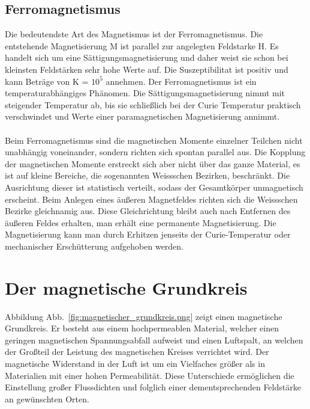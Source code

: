 \documentclass[a4paper,twoside,12pt,DIV=13,BCOR=5mm,numbers=noenddot,cleardoublepage=empty]{scrbook}
\begin{document}
        \subsection{Ferromagnetismus}
        Die bedeutendste Art des Magnetismus ist der Ferromagnetismus. Die 
        entstehende Magnetisierung M ist parallel zur angelegten Feldstarke H. 
        Es handelt sich um eine S\"attigungsmagnetisierung und daher weist sie 
        schon bei kleinsten Feldst\"arken sehr hohe Werte auf. Die 
        Suszeptibilitat ist positiv und kann Betr\"age von K = $10^5$ annehmen. 
        Der Ferromagnetismus ist ein temperaturabh\"angiges Ph\"anomen. Die 
        S\"attigungsmagnetisierung nimmt mit steigender Temperatur ab, bis sie 
        schlie\ss{}lich bei der Curie Temperatur praktisch verschwindet und Werte 
        einer paramagnetischen Magnetisierung annimmt.
        \\
        \\
        Beim Ferromagnetismus sind die magnetischen Momente einzelner Teilchen 
        nicht unabh\"angig voneinander, sondern richten sich spontan parallel 
        aus. Die Kopplung der magnetischen Momente erstreckt sich aber nicht 
        \"uber das ganze Material, es ist auf kleine Bereiche, die sogenannten 
        Weissschen Bezirken, beschr\"ankt. Die Ausrichtung dieser ist statistisch 
        verteilt, sodass der Gesamtk\"orper unmagnetisch erscheint. Beim Anlegen 
        eines \"au\ss{}eren Magnetfeldes richten sich die Weissschen Bezirke 
        gleichnamig aus. Diese Gleichrichtung bleibt auch nach Entfernen des 
        \"au\ss{}eren Feldes erhalten, man erh\"alt eine permanente Magnetisierung. 
        Die Magnetisierung kann man durch Erhitzen jenseits der Curie-Temperatur 
        oder mechanischer Ersch\"utterung aufgehoben werden. 
    \section{Der magnetische Grundkreis}
    Abbildung Abb.~\ref{fig:magnetischer_grundkreis.png} zeigt einen magnetische Grundkreis. Er besteht aus einem 
    hochpermeablen Material, welcher einen geringen magnetischen 
    Spannungsabfall aufweist und einen Luftspalt, an welchen der Gro\ss{}teil der 
    Leistung des magnetischen Kreises verrichtet wird. Der magnetische 
    Widerstand in der Luft ist um ein Vielfaches gr\"o\ss{}er als in Materialien mit 
    einer hohen Permeabilit\"at. Diese Unterschiede erm\"oglichen die Einstellung 
    gro\ss{}er Flussdichten und folglich einer dementsprechenden Feldst\"arke an 
    gew\"unschten Orten.
\end{document}
